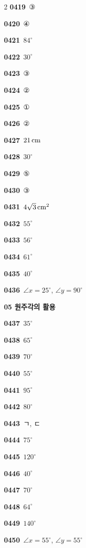 \documentclass[10pt,a4paper]{article}
\begin{document}
\begin{multicols}{2}
\noindent\textbf{0419}\ ③\par
\noindent\textbf{0420}\ ④\par
\noindent\textbf{0421}\ $84^\circ$\par
\noindent\textbf{0422}\ $30^\circ$\par
\noindent\textbf{0423}\ ③\par
\noindent\textbf{0424}\ ②\par
\noindent\textbf{0425}\ ①\par
\noindent\textbf{0426}\ ②\par
\noindent\textbf{0427}\ $21\mkern3mu \mathrm{cm}$\par
\noindent\textbf{0428}\ $30^\circ$\par
\noindent\textbf{0429}\ ⑤\par
\noindent\textbf{0430}\ ③\par
\noindent\textbf{0431}\ $4\sqrt{3}\mkern3mu \mathrm{cm}^2$\par
\noindent\textbf{0432}\ $55^\circ$\par
\noindent\textbf{0433}\ $56^\circ$\par
\noindent\textbf{0434}\ $61^\circ$\par
\noindent\textbf{0435}\ $40^\circ$\par
\noindent\textbf{0436}\ $\angle x=25^\circ$, $\angle y=90^\circ$\par
\noindent\textbf{05 원주각의 활용}\par\smallskip
\noindent\textbf{0437}\ $35^\circ$\par
\noindent\textbf{0438}\ $65^\circ$\par
\noindent\textbf{0439}\ $70^\circ$\par
\noindent\textbf{0440}\ $55^\circ$\par
\noindent\textbf{0441}\ $95^\circ$\par
\noindent\textbf{0442}\ $80^\circ$\par
\noindent\textbf{0443}\ ㄱ, ㄷ\par
\noindent\textbf{0444}\ $75^\circ$\par
\noindent\textbf{0445}\ $120^\circ$\par
\noindent\textbf{0446}\ $40^\circ$\par
\noindent\textbf{0447}\ $70^\circ$\par
\noindent\textbf{0448}\ $64^\circ$\par
\noindent\textbf{0449}\ $140^\circ$\par
\noindent\textbf{0450}\ $\angle x=55^\circ$, $\angle y=55^\circ$\par

\end{multicols}
\end{document}
